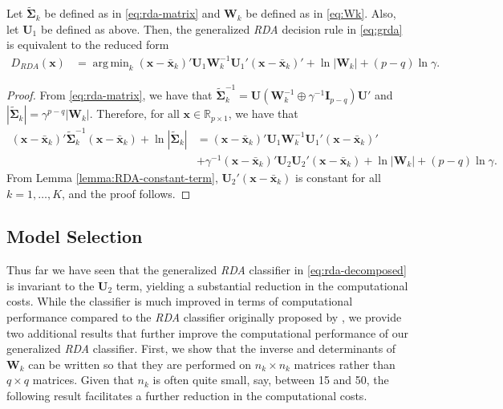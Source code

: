 \documentclass[11pt]{article}
\newcommand{\xbar}{\bar{\bm x}}
\DeclareMathOperator*{\argmin}{arg\,min}
\begin{document}
\begin{thm}
Let $\tilde{\bm \Sigma}_k$ be defined as in \eqref{eq:rda-matrix} and $\bm W_k$ be defined as in \eqref{eq:Wk}. Also, let $\bm U_1$ be defined as above. Then, the generalized \emph{RDA} decision rule in \eqref{eq:grda} is equivalent to the reduced form
	\begin{align}
		D_{RDA}(\bm x) &= \argmin_k  (\bm x - \xbar_k)' \bm U_1 \bm W_k^{-1} \bm U_1' (\bm x - \xbar_k)' + \ln | \bm W_k | + (p - q) \ln \gamma. \label{eq:rda-decomposed}
	\end{align}
	
\end{thm}
\begin{proof}
	From \eqref{eq:rda-matrix}, we have that $\tilde{\bm \Sigma}_k^{-1} = \bm U(\bm W_k^{-1} \oplus\gamma^{-1} \bm I_{p - q})\bm U'$ and $|\tilde{\bm \Sigma}_k| = \gamma^{p-q} | \bm W_k |$. Therefore, for all $\bm x \in \mathbb{R}_{p \times 1}$, we have that
	\begin{align*}
	(\bm x - \xbar_k)' \tilde{\bm\Sigma}_k^{-1}(\bm x - \xbar_k)  + \ln |\tilde{\bm\Sigma}_k| &= (\bm x - \xbar_k)' \bm U_1 \bm W_k^{-1} \bm U_1' (\bm x - \xbar_k)'\\
	&+ \gamma^{-1} (\bm x - \xbar_k)' \bm U_2 \bm U_2' (\bm x - \xbar_k) + \ln | \bm W_k | + (p - q) \ln \gamma.
	\end{align*}
From Lemma \ref{lemma:RDA-constant-term}, $\bm U_2' (\bm x - \xbar_k)$ is constant for all $k = 1, \ldots, K$, and the proof follows.
\end{proof}

\subsection{Model Selection}

Thus far we have seen that the generalized \emph{RDA} classifier in \eqref{eq:rda-decomposed} is invariant to the $\bm U_2$ term, yielding a substantial reduction in the computational costs. While the classifier is much improved in terms of computational performance compared to the \emph{RDA} classifier originally proposed by \cite{Friedman:1989tm}, we provide two additional results that further improve the computational performance of our generalized \emph{RDA} classifier. First, we show that the inverse and determinants of $\bm W_k$ can be written so that they are performed on $n_k \times n_k$ matrices rather than $q \times q$ matrices. Given that $n_k$ is often quite small, say, between 15 and 50, the following result facilitates a further reduction in the computational costs.
\end{document}
